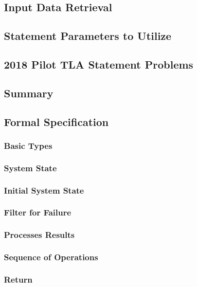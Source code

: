 \documentclass{article}
\begin{document}
\subsection{Input Data Retrieval}

\subsection{Statement Parameters to Utilize}

\subsection{2018 Pilot TLA Statement Problems}

\subsection{Summary}

\subsection{Formal Specification}

\subsubsection{Basic Types}

\subsubsection{System State}

\subsubsection{Initial System State}

\subsubsection{Filter for Failure}

\subsubsection{Processes Results}

\subsubsection{Sequence of Operations}

\subsubsection{Return}
\end{document}
